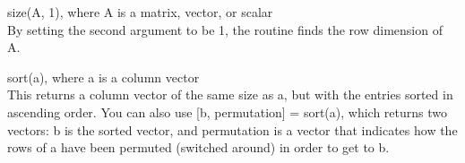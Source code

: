 \documentclass[oneside, english, reqno]{amsart}
\theoremstyle{plain}
\theoremstyle{plain}
\theoremstyle{plain}
\theoremstyle{plain}
\theoremstyle{definition}
\theoremstyle{definition}
\theoremstyle{definition}
\numberwithin{equation}{section}
\begin{document}
\noindent size(A, 1), where A is a matrix, vector, or scalar \\[6pt]
\mbox{\hspace{0.5cm}} By setting the second argument to be 1, the routine finds the row dimension of A. \vspace{15pt}

\noindent sort(a), where a is a column vector \\[6pt]
\mbox{\hspace{0.5cm}} This returns a column vector of the same size as a, but with the entries sorted in ascending order. You can also use [b, permutation] = sort(a), which returns two vectors: b is the sorted vector, and permutation is a vector that indicates how the rows of a have been permuted (switched around) in order to get to b. \vspace{10pt}
\end{document}
